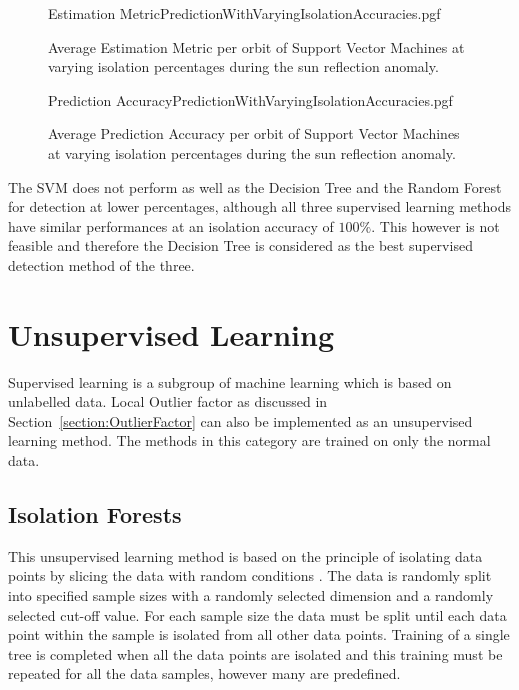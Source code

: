 \begin{figure}[!htb]
	\centering
	{Estimation MetricPredictionWithVaryingIsolationAccuracies.pgf}
	
	\caption{Average Estimation Metric per orbit of Support Vector Machines at varying isolation percentages  during the sun reflection anomaly.}
	\label{fig:SVMWithVaryingIsolationEstimation}
\end{figure}

\begin{figure}[!htb]
	\centering
	{Prediction AccuracyPredictionWithVaryingIsolationAccuracies.pgf}
	
	\caption{Average Prediction Accuracy per orbit of Support Vector Machines at varying isolation percentages  during the sun reflection anomaly.}
	\label{fig:SVMWithVaryingIsolationPrediction}
\end{figure}

The SVM does not perform as well as the Decision Tree and the Random Forest for detection at lower percentages, although all three supervised learning methods have similar performances at an isolation accuracy of $100\%$. This however is not feasible and therefore the Decision Tree is considered as the best supervised detection method of the three.

\section{Unsupervised Learning}
Supervised learning is a subgroup of machine learning which is based on unlabelled data. Local Outlier factor as discussed in Section~\ref{section:OutlierFactor} can also be implemented as an unsupervised learning method. The methods in this category are trained on only the normal data. 

\subsection{Isolation Forests}
This unsupervised learning method is based on the principle of isolating data points by slicing the data with random conditions \cite{TonyLiu2008}. The data is randomly split into specified sample sizes with a randomly selected dimension and a randomly selected cut-off value. For each sample size the data must be split until each data point within the sample is isolated from all other data points. Training of a single tree is completed when all the data points are isolated and this training must be repeated for all the data samples, however many are predefined. 

